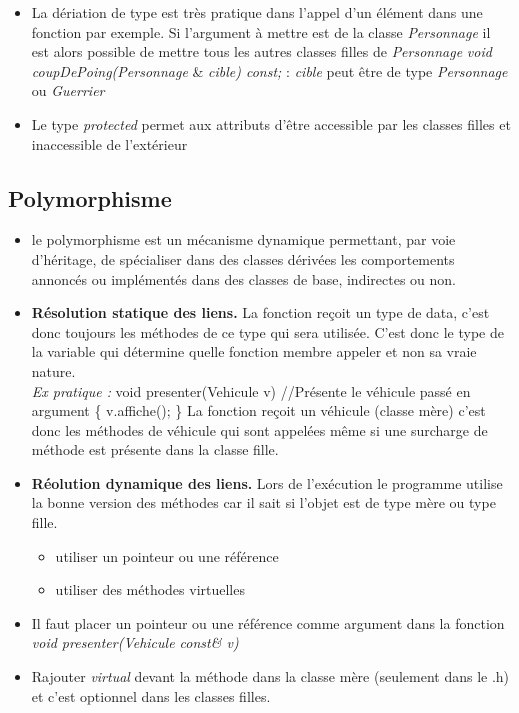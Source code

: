 \documentclass[12pt,a4paper]{article}
\begin{document}
\begin{itemize}
\item La dériation de type est très pratique dans l'appel d'un élément dans une fonction par exemple. Si l'argument à mettre est de la classe \textit{Personnage} il est alors possible de mettre tous les autres classes filles de \textit{Personnage}
\newline \textit{void coupDePoing(Personnage} \& \textit{cible) const;} : \textit{cible} peut être de type \textit{Personnage} ou \textit{Guerrier}
\item Le type \textit{protected} permet aux attributs d'être accessible par les classes filles et inaccessible de l'extérieur
\end{itemize}

\subsection{Polymorphisme}
\begin{itemize}
\item  le polymorphisme est un mécanisme dynamique permettant, par voie d'héritage, de spécialiser dans des classes dérivées les comportements annoncés ou implémentés dans des classes de base, indirectes ou non.
\item \textbf{Résolution statique des liens.} La fonction reçoit un type de data, c'est donc toujours les méthodes de ce type qui sera utilisée. C'est donc le type de la variable qui détermine quelle fonction membre appeler et non sa vraie nature.\\
\textit{Ex pratique : } 
\newline void presenter(Vehicule v)  //Présente le véhicule passé en argument
\newline \{  v.affiche(); \}
\newline La fonction reçoit un véhicule (classe mère) c’est donc les méthodes de véhicule qui sont appelées même si une surcharge de méthode est présente dans la classe fille.
\item \textbf{Réolution dynamique des liens.} Lors de l'exécution le programme utilise la bonne version des méthodes car il sait si l'objet est de type mère ou type fille.
\begin{itemize}
\item utiliser un pointeur ou une référence
\item utiliser des méthodes virtuelles
\end{itemize}
\item Il faut placer un pointeur ou une référence comme argument dans la fonction \textit{void presenter(Vehicule const\& v)}
\item Rajouter \textit{virtual} devant la méthode dans la classe mère (seulement dans le .h) et c’est optionnel dans les classes filles.
\end{itemize}
\end{document}

